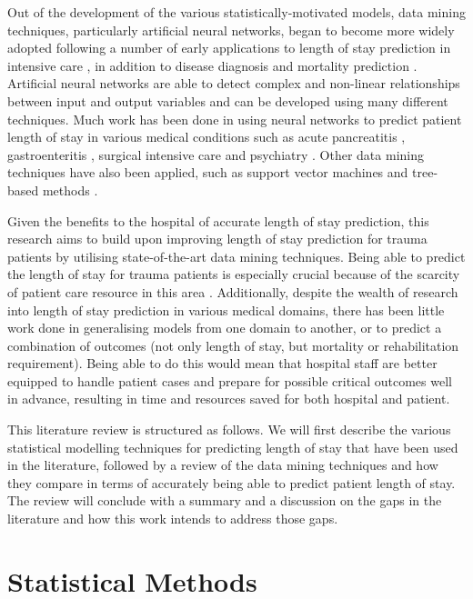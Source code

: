 Out of the development of the various statistically-motivated models, data
mining techniques, particularly artificial neural networks,
began to become more widely adopted following a number of
early applications to length of stay prediction in intensive
care \citep{Dybowski1996,Tu1993}, in addition to disease diagnosis and mortality
prediction \citep{Silva2006}. Artificial neural networks are able to detect
complex and non-linear relationships between input and output variables and can
be developed using many different techniques. Much work has been done in using
neural networks to predict patient length of stay in various medical conditions
such as acute pancreatitis \citep{Walczak2003}, gastroenteritis \citep{Ng2006},
surgical intensive care \citep{Buchman1994,Tu1993} and
psychiatry \citep{Lowell1997}. Other data mining techniques have also been
applied, such as support vector machines and tree-based
methods \citep{Harper2005}.

Given the benefits to the hospital of accurate length of stay prediction,
this research aims to build upon improving length of stay prediction for trauma
patients by utilising state-of-the-art data mining techniques. Being able to
predict the length of stay for trauma patients is especially crucial because of
the scarcity of patient care resource in this area \citep{Yang2010}.
Additionally,
despite the wealth of research into length of stay prediction in various
medical domains, there has been little work done in generalising models from
one domain to another, or to predict a combination of outcomes (not only
length of stay, but mortality or rehabilitation requirement). Being able to
do this would mean that hospital staff are better equipped to handle patient
cases and prepare for possible critical outcomes well in advance, resulting
in time and resources saved for both hospital and patient.

This literature review is structured as follows. We will first describe the
various statistical modelling techniques for predicting length of stay that
have been used in the literature, followed by a review of the data mining
techniques and how they compare in terms of accurately being able to predict
patient length of stay. The review will conclude with a summary and a
discussion on the gaps in the literature and how this work intends to address
those gaps.

\section{Statistical Methods}
